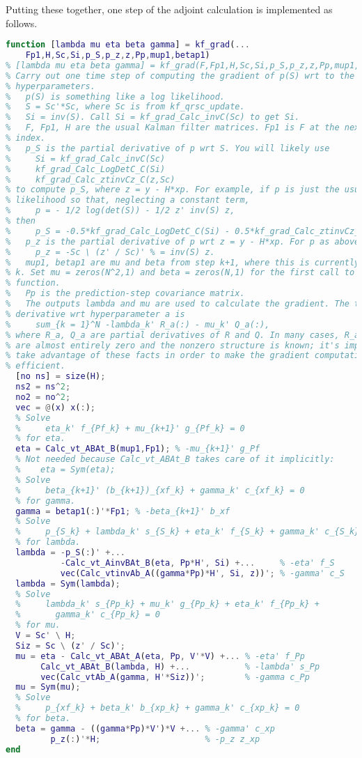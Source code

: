 \documentclass[10pt,fleqn]{article}
\begin{document}
Putting these together, one step of the adjoint calculation is implemented as
follows.
\begin{lstlisting}[language=matlab,basicstyle=\footnotesize]
function [lambda mu eta beta gamma] = kf_grad(...
    Fp1,H,Sc,Si,p_S,p_z,z,Pp,mup1,betap1)
% [lambda mu eta beta gamma] = kf_grad(F,Fp1,H,Sc,Si,p_S,p_z,z,Pp,mup1,betap1)
% Carry out one time step of computing the gradient of p(S) wrt to the
% hyperparameters.
%   p(S) is something like a log likelihood.
%   S = Sc'*Sc, where Sc is from kf_qrsc_update.
%   Si = inv(S). Call Si = kf_grad_Calc_invC(Sc) to get Si.
%   F, Fp1, H are the usual Kalman filter matrices. Fp1 is F at the next time
% index.
%   p_S is the partial derivative of p wrt S. You will likely use
%     Si = kf_grad_Calc_invC(Sc)
%     kf_grad_Calc_LogDetC_C(Si)
%     kf_grad_Calc_ztinvCz_C(z,Sc)
% to compute p_S, where z = y - H*xp. For example, if p is just the usual log
% likelihood so that, neglecting a constant term,
%     p = - 1/2 log(det(S)) - 1/2 z' inv(S) z,
% then
%     p_S = -0.5*kf_grad_Calc_LogDetC_C(Si) - 0.5*kf_grad_Calc_ztinvCz_C(Sc,z).
%   p_z is the partial derivative of p wrt z = y - H*xp. For p as above,
%     p_z = -Sc \ (z' / Sc)' % = inv(S) z.
%   mup1, betap1 are mu and beta from step k+1, where this is currently step
% k. Set mu = zeros(N^2,1) and beta = zeros(N,1) for the first call to this
% function.
%   Pp is the prediction-step covariance matrix.
%   The outputs lambda and mu are used to calculate the gradient. The total
% derivative wrt hyperparameter a is
%     sum_{k = 1}^N -lambda_k' R_a(:) - mu_k' Q_a(:),
% where R_a, Q_a are partial derivatives of R and Q. In many cases, R_a and Q_a
% are almost entirely zero and the nonzero structure is known; it's important to
% take advantage of these facts in order to make the gradient computation
% efficient.
  [no ns] = size(H);
  ns2 = ns^2;
  no2 = no^2;
  vec = @(x) x(:);
  % Solve
  %     eta_k' f_{Pf_k} + mu_{k+1}' g_{Pf_k} = 0
  % for eta.
  eta = Calc_vt_ABAt_B(mup1,Fp1); % -mu_{k+1}' g_Pf
  % Not needed because Calc_vt_ABAt_B takes care of it implicitly:
  %    eta = Sym(eta);
  % Solve
  %     beta_{k+1}' (b_{k+1})_{xf_k} + gamma_k' c_{xf_k} = 0
  % for gamma.
  gamma = betap1(:)'*Fp1; % -beta_{k+1}' b_xf
  % Solve
  %     p_{S_k} + lambda_k' s_{S_k} + eta_k' f_{S_k} + gamma_k' c_{S_k} = 0
  % for lambda.
  lambda = -p_S(:)' +...
           -Calc_vt_AinvBAt_B(eta, Pp*H', Si) +...     % -eta' f_S
           vec(Calc_vtinvAb_A((gamma*Pp)*H', Si, z))'; % -gamma' c_S
  lambda = Sym(lambda);
  % Solve
  %     lambda_k' s_{Pp_k} + mu_k' g_{Pp_k} + eta_k' f_{Pp_k} +
  %       gamma_k' c_{Pp_k} = 0
  % for mu.
  V = Sc' \ H;
  Siz = Sc \ (z' / Sc)';
  mu = eta - Calc_vt_ABAt_A(eta, Pp, V'*V) +... % -eta' f_Pp
       Calc_vt_ABAt_B(lambda, H) +...           % -lambda' s_Pp
       vec(Calc_vtAb_A(gamma, H'*Siz))';        % -gamma c_Pp
  mu = Sym(mu);
  % Solve
  %     p_{xf_k} + beta_k' b_{xp_k} + gamma_k' c_{xp_k} = 0
  % for beta.
  beta = gamma - ((gamma*Pp)*V')*V +... % -gamma' c_xp
         p_z(:)'*H;                     % -p_z z_xp
end
\end{lstlisting}
\end{document}

